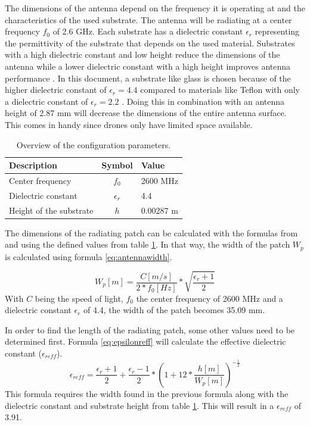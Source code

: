 The dimensions of the antenna depend on the frequency it is operating at and the characteristics of the used substrate.
The antenna will be radiating at a center frequency $f_0$ of 2.6 GHz. Each substrate has a \gls{dielectric constant} $\epsilon_r$ representing 
the permittivity of the substrate that depends on the used material.
Substrates with a high \gls{dielectric constant} and low height 
reduce the dimensions of the antenna
while a lower \gls{dielectric constant} with a high height improves antenna performance \cite{J14_antennadesign,J15_antennadesign}. 
In this document, a substrate like glass 
is chosen because of the higher \gls{dielectric constant} of $\epsilon_r = 4.4$ compared to materials like Teflon with only a dielectric 
constant of $\epsilon_r = 2.2$ \cite{J14_antennadesign}. 
Doing this in combination with an antenna height of 2.87 mm will decrease the dimensions of the entire antenna surface.
This comes in handy since drones only have limited space available.

\begin{table}[h!]
\centering
\begin{tabular}{|l|c|l|}
\hline
 Description            & Symbol          & Value         \\    \hline
 Center frequency       & $f_0$           & 2600 MHz       \\ 
 Dielectric constant    & $\epsilon_r$    & 4.4         \\ 
 Height of the substrate & $h$             & 0.00287 m    \\ \hline
\end{tabular}
\caption{Overview of the configuration parameters.}
\label{table:antennaparas}
\end{table}

The dimensions of the radiating patch can be calculated with the formulas from \cite{J14_antennadesign} and \cite{J15_antennadesign}
using the defined values from table \ref{table:antennaparas}. In that way, the width of the patch $W_{p}$ is calculated using formula \ref{eq:antennawidth}.

\begin{equation} 
W_{p} [m] = \frac{C [m/s]}{2*f_0 [Hz]}*\sqrt{\frac{\epsilon_r+1}{2}}
\label{eq:antennawidth}
\end{equation}
With $C$ being the speed of light, $f_0$ the center frequency of 2600 MHz and a \gls{dielectric constant} $\epsilon_r$ of 4.4, the width of the patch becomes 35.09 mm.

In order to find the length of the radiating patch, some other values need to be determined first. Formula \ref{eq:epsilonreff} will
calculate the effective \gls{dielectric constant} ($\epsilon_{reff}$).
\begin{equation} 
\epsilon_{reff} = \frac{\epsilon_r+1}{2}+  \frac{\epsilon_r-1}{2} * \left(1+12*\frac{h [m]}{W_{p} [m] }\right)^{-\frac{1}{2}}
\label{eq:epsilonreff}
\end{equation}
This formula requires the width found in the previous formula along with the \gls{dielectric constant} and substrate height from table \ref{table:antennaparas}.
This will result in a $\epsilon_{reff}$ of 3.91.

